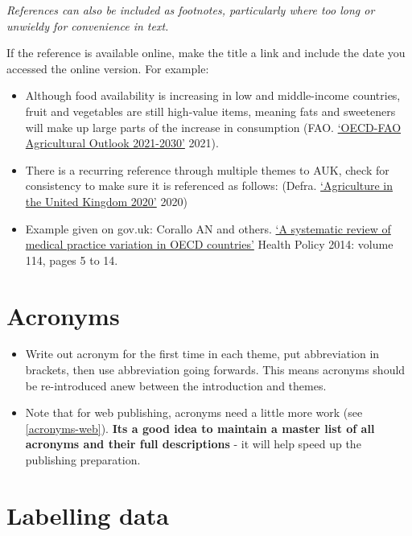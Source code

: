 \documentclass[
]{book}
\begin{document}
\emph{References can also be included as footnotes, particularly where too long or unwieldy for convenience in text.}

If the reference is available online, make the title a link and include the date
you accessed the online version. For example:

\begin{itemize}
\item
  Although food availability is increasing in low and middle-income countries, fruit and vegetables are still high-value items, meaning fats and sweeteners will make up large parts of the increase in consumption (FAO. \href{https://www.fao.org/3/cb5332en/cb5332en.pdf}{`OECD-FAO Agricultural Outlook 2021-2030'} 2021).
\item
  There is a recurring reference through multiple themes to AUK, check for consistency to make sure it is referenced as follows: (Defra. \href{https://assets.publishing.service.gov.uk/government/uploads/system/uploads/attachment_data/file/1056618/AUK2020_22feb22.pdf}{`Agriculture in the United Kingdom 2020'} 2020)
\item
  Example given on gov.uk: Corallo AN and others. \href{https://www.sciencedirect.com/journal/health-policy}{`A systematic review of medical practice variation in OECD countries'} Health Policy 2014: volume 114, pages 5 to 14.
\end{itemize}

\hypertarget{acronyms-text}{%
\section{Acronyms}\label{acronyms-text}}

\begin{itemize}
\item
  Write out acronym for the first time in each theme, put abbreviation in brackets, then use abbreviation going forwards. This means acronyms should be re-introduced anew between the introduction and themes.
\item
  Note that for web publishing, acronyms need a little more work (see \ref{acronyms-web}). \textbf{Its a good idea to maintain a master list of all acronyms and their full descriptions} - it will help speed up the publishing preparation.
\end{itemize}

\hypertarget{labelling-data}{%
\section{Labelling data}\label{labelling-data}}
\end{document}
